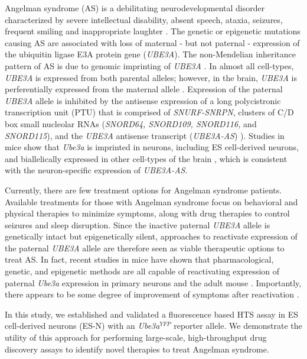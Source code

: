 Angelman syndrome (AS) is a debilitating neurodevelopmental disorder characterized by severe intellectual disability, absent speech, ataxia, seizures, frequent smiling and inappropriate laughter \cite{Kishino1997,Matsuura1997,Williams2006}. The genetic or epigenetic mutations causing AS are associated with loss of maternal - but not paternal - expression of the ubiquitin ligase E3A protein gene (\textit{UBE3A}). The non-Mendelian inheritance pattern of AS is due to genomic imprinting of \textit{UBE3A} \cite{Kishino1997,Matsuura1997}. In almost all cell-types, \textit{UBE3A} is expressed from both parental alleles; however, in the brain, \textit{UBE3A} is perferentially expressed from the maternal allele \cite{Yamasaki2003}. Expression of the paternal \textit{UBE3A} allele is inhibited by the antisense expression of a long polycistronic transcription unit (PTU) that is comprised of \textit{SNURF-SNRPN}, clusters of C/D box small nucleolar RNAs (\textit{SNORD64, SNORD109, SNORD116,} and \textit{SNORD115}), and the \textit{UBE3A} antisense transcript (\textit{UBE3A-AS}) \cite{Meng2012,Meng2013}). Studies in mice show that \textit{Ube3a} is imprinted in neurons, including ES cell-derived neurons, and biallelically expressed in other cell-types of the brain \cite{Landers2004,Rougeulle1998,Runte2004,Yamasaki2003}, which is consistent with the neuron-specific expression of \textit{UBE3A-AS}.

Currently, there are few treatment options for Angelman syndrome patients. Available treatments for those with Angelman syndrome focus on behavioral and physical therapies to minimize symptoms, along with drug therapies to control seizures and sleep disruption. Since the inactive paternal \textit{UBE3A} allele is genetically intact but epigenetically silent, approaches to reactivate expression of the paternal \textit{UBE3A} allele are therefore seen as viable therapeutic options to treat AS. In fact, recent studies in mice have shown that pharmacological, genetic, and epigenetic methods are all capable of reactivating expression of paternal \textit{Ube3a} expression in primary neurons and the adult mouse \cite{Bailus2016,Huang2012,Meng2013,Meng2015}. Importantly, there appears to be some degree of improvement of symptoms after reactivation \cite{Elgersma2007,Meng2015,Shi2015,Silva-Santos2015}.

In this study, we established and validated a fluorescence based HTS assay in ES cell-derived neurons (ES-N) with an \textit{Ube3a$^{YFP}$} reporter allele. We demonstrate the utility of this approach for performing large-scale, high-throughput drug discovery assays to identify novel therapies to treat Angelman syndrome.

